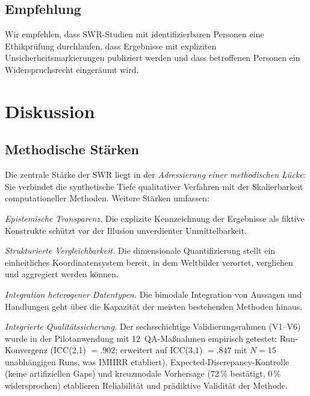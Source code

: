 \documentclass[11pt,a4paper]{article}
\theoremstyle{definition}
\theoremstyle{plain}
\theoremstyle{remark}
\begin{document}
\subsection{Empfehlung}

Wir empfehlen, dass SWR-Studien mit identifizierbaren Personen eine Ethikpr\"ufung durchlaufen, dass Ergebnisse mit expliziten Unsicherheitsmarkierungen publiziert werden und dass betroffenen Personen ein Widerspruchsrecht einger\"aumt wird.



\section{Diskussion}
\label{sec:diskussion}

\subsection{Methodische St\"arken}
\label{sec:staerken}

Die zentrale St\"arke der SWR liegt in der \emph{Adressierung einer methodischen L\"ucke}: Sie verbindet die synthetische Tiefe qualitativer Verfahren mit der Skalierbarkeit computationeller Methoden. Weitere St\"arken umfassen:

\emph{Epistemische Transparenz.} Die explizite Kennzeichnung der Ergebnisse als fiktive Konstrukte sch\"utzt vor der Illusion unverdienter Unmittelbarkeit.

\emph{Strukturierte Vergleichbarkeit.} Die dimensionale Quantifizierung stellt ein einheitliches Koordinatensystem bereit, in dem Weltbilder verortet, verglichen und aggregiert werden k\"onnen.

\emph{Integration heterogener Datentypen.} Die bimodale Integration von Aussagen und Handlungen geht \"uber die Kapazit\"at der meisten bestehenden Methoden hinaus.

\emph{Integrierte Qualit\"atssicherung.} Der sechsschichtige Validierungsrahmen (V1--V6) wurde in der Pilotanwendung mit 12~QA-Ma\ss{}nahmen empirisch getestet: Run-Konvergenz (ICC(2,1) $= .902$; erweitert auf ICC(3,1) $= .847$ mit $N = 15$ unabh\"angigen Runs, was IMIIRR etabliert), Expected-Discrepancy-Kontrolle (keine artifiziellen Gaps) und kreuzmodale Vorhersage (72\,\% best\"atigt, 0\,\% widersprochen) etablieren Reliabilit\"at und pr\"adiktive Validit\"at der Methode.
\end{document}
